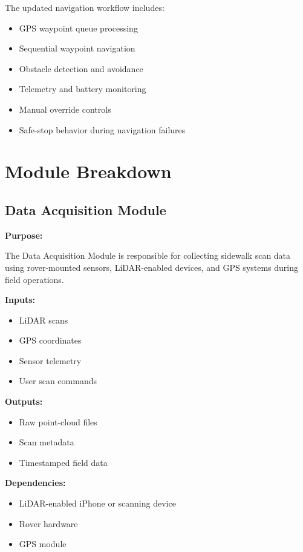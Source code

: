 \documentclass{article}
\begin{document}
The updated navigation workflow includes:

\begin{itemize}
    \item GPS waypoint queue processing
    \item Sequential waypoint navigation
    \item Obstacle detection and avoidance
    \item Telemetry and battery monitoring
    \item Manual override controls
    \item Safe-stop behavior during navigation failures
\end{itemize}

\section{Module Breakdown}

\subsection{Data Acquisition Module}

\textbf{Purpose:}

The Data Acquisition Module is responsible for collecting sidewalk scan data using rover-mounted sensors, LiDAR-enabled devices, and GPS systems during field operations.

\textbf{Inputs:}

\begin{itemize}
    \item LiDAR scans
    \item GPS coordinates
    \item Sensor telemetry
    \item User scan commands
\end{itemize}

\textbf{Outputs:}

\begin{itemize}
    \item Raw point-cloud files
    \item Scan metadata
    \item Timestamped field data
\end{itemize}

\textbf{Dependencies:}

\begin{itemize}
    \item LiDAR-enabled iPhone or scanning device
    \item Rover hardware
    \item GPS module
\end{itemize}
\end{document}
